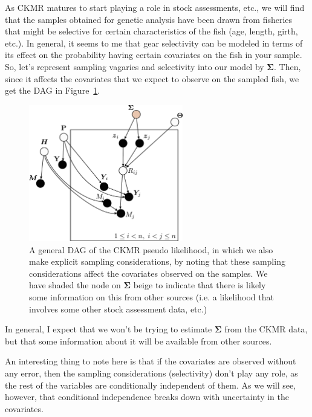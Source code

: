 \documentclass[11pt, oneside]{article}   	%
\newcommand{\bSig}{\mathbf{\Sigma}}
\begin{document}
As CKMR matures to start playing a role in stock assessments, etc., we will
find that the samples obtained for genetic analysis have been drawn from
fisheries that might be selective for certain characteristics of the fish (age, length, girth, etc.).  In general, it seems to me that gear selectivity can be
modeled in terms of its effect on the probability having certain covariates
on the fish in your sample.  So, let's represent sampling vagaries and selectivity
into our model by $\bSig$.  Then, since it affects the covariates that we expect
to observe on the sampled fish, we get the DAG in Figure~\ref{fig:general_dag_1_bSig}.
\begin{figure}
\begin{center}
\includegraphics[width=0.6\textwidth]{images/general-dag-1-bSig.pdf}
\end{center}
\caption{A general DAG of the CKMR pseudo likelihood, in which we
also make explicit sampling considerations, by noting that these sampling
considerations affect the covariates observed on the samples. We have
shaded the node on $\bSig$ beige to indicate that there is likely some
information on this from other sources (i.e. a likelihood that involves
some other stock assessment
data, etc.)}
\label{fig:general_dag_1_bSig}
\end{figure}
In general, I expect that we won't be trying to estimate $\bSig$ from the
CKMR data, but that some information about it will be available from
other sources.

An interesting thing to note here is that if the covariates are observed
without any error, then the sampling considerations (selectivity) don't 
play any role, as the rest of the variables are conditionally independent of them.
As we will see, however, that conditional independence breaks down
with uncertainty in the covariates.
\end{document}
